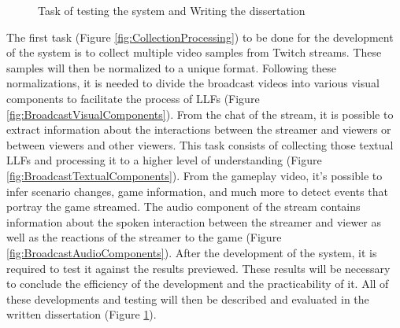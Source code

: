     \begin{figure}[htbp]
        \centering
        \fboxsep=0pt\fboxrule=0.5pt
        {}%
        \caption{Task of testing the system and Writing the dissertation}
        \label{fig:TestsConclusionWriting}
    \end{figure}

    The first task (Figure \ref{fig:CollectionProcessing}) to be done for the development of the system is to collect multiple video samples from Twitch streams. These samples will then be normalized to a unique format. Following these normalizations, it is needed to divide the broadcast videos into various visual components to facilitate the process of \gls{LLF}s (Figure \ref{fig:BroadcastVisualComponents}). From the chat of the stream, it is possible to extract information about the interactions between the streamer and viewers or between viewers and other viewers. This task consists of collecting those textual \gls{LLF}s and processing it to a higher level of understanding (Figure \ref{fig:BroadcastTextualComponents}). From the gameplay video, it's possible to infer scenario changes, game information, and much more to detect events that portray the game streamed. The audio component of the stream contains information about the spoken interaction between the streamer and viewer as well as the reactions of the streamer to the game (Figure \ref{fig:BroadcastAudioComponents}). After the development of the system, it is required to test it against the results previewed. These results will be necessary to conclude the efficiency of the development and the practicability of it. All of these developments and testing will then be described and evaluated in the written dissertation (Figure \ref{fig:TestsConclusionWriting}).

    

    

    